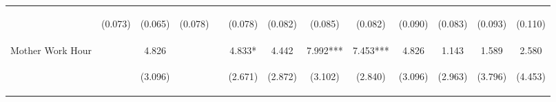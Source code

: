 \begin{tabular}{lcccccccccccc}
 & \begin{footnotesize}(0.073)\end{footnotesize} & \begin{footnotesize}(0.065)\end{footnotesize} & \begin{footnotesize}(0.078)\end{footnotesize} & \begin{footnotesize}\end{footnotesize} & \begin{footnotesize}(0.078)\end{footnotesize} & \begin{footnotesize}(0.082)\end{footnotesize} & \begin{footnotesize}(0.085)\end{footnotesize} & \begin{footnotesize}(0.082)\end{footnotesize} & \begin{footnotesize}(0.090)\end{footnotesize} & \begin{footnotesize}(0.083)\end{footnotesize} & \begin{footnotesize}(0.093)\end{footnotesize} & \begin{footnotesize}(0.110)\end{footnotesize}\\
\noalign{\smallskip}Mother Work Hour &  & 4.826 &  &  & 4.833* & 4.442 & 7.992*** & 7.453*** & 4.826 & 1.143 & 1.589 & 2.580\\
 & \begin{footnotesize}\end{footnotesize} & \begin{footnotesize}(3.096)\end{footnotesize} & \begin{footnotesize}\end{footnotesize} & \begin{footnotesize}\end{footnotesize} & \begin{footnotesize}(2.671)\end{footnotesize} & \begin{footnotesize}(2.872)\end{footnotesize} & \begin{footnotesize}(3.102)\end{footnotesize} & \begin{footnotesize}(2.840)\end{footnotesize} & \begin{footnotesize}(3.096)\end{footnotesize} & \begin{footnotesize}(2.963)\end{footnotesize} & \begin{footnotesize}(3.796)\end{footnotesize} & \begin{footnotesize}(4.453)\end{footnotesize}\\

\end{tabular}
